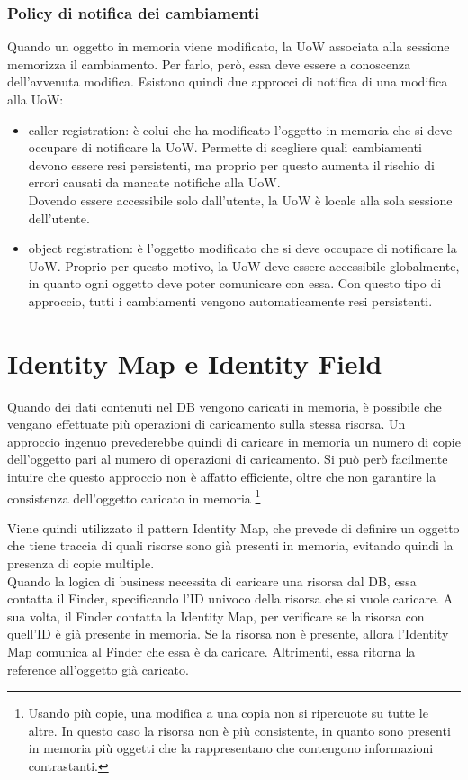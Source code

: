 \subsubsection{Policy di notifica dei cambiamenti}
Quando un oggetto in memoria viene modificato, la UoW associata alla sessione memorizza il cambiamento. Per farlo, però, essa deve essere a conoscenza dell'avvenuta modifica.
Esistono quindi due approcci di notifica di una modifica alla UoW:
\begin{itemize}
    \item caller registration: è colui che ha modificato l'oggetto in memoria che si deve occupare di notificare la UoW. Permette di scegliere quali cambiamenti devono essere resi persistenti, ma proprio per questo aumenta il rischio di errori causati da mancate notifiche alla UoW.\\
    Dovendo essere accessibile solo dall'utente, la UoW è locale alla sola sessione dell'utente.
    \item object registration: è l'oggetto modificato che si deve occupare di notificare la UoW.
    Proprio per questo motivo, la UoW deve essere accessibile globalmente, in quanto ogni oggetto deve poter comunicare con essa. Con questo tipo di approccio, tutti i cambiamenti vengono automaticamente resi persistenti.
\end{itemize}

\section{Identity Map e Identity Field}
Quando dei dati contenuti nel DB vengono caricati in memoria, è possibile che vengano effettuate più operazioni di caricamento sulla stessa risorsa. Un approccio ingenuo prevederebbe quindi di caricare in memoria un numero di copie dell'oggetto pari al numero di operazioni di caricamento. Si può però facilmente intuire che questo approccio non è affatto efficiente, oltre che non garantire la consistenza dell'oggetto caricato in memoria \footnote{Usando più copie, una modifica a una copia non si ripercuote su tutte le altre. In questo caso la risorsa non è più consistente, in quanto sono presenti in memoria più oggetti che la rappresentano che contengono informazioni contrastanti.}

Viene quindi utilizzato il pattern Identity Map, che prevede di definire un oggetto che tiene traccia di quali risorse sono già presenti in memoria, evitando quindi la presenza di copie multiple.\\
Quando la logica di business necessita di caricare una risorsa dal DB, essa contatta il Finder, specificando l'ID univoco della risorsa che si vuole caricare. A sua volta, il Finder contatta la Identity Map, per verificare se la risorsa con quell'ID è già presente in memoria. Se la risorsa non è presente, allora l'Identity Map comunica al Finder che essa è da caricare. Altrimenti, essa ritorna la reference all'oggetto già caricato.

